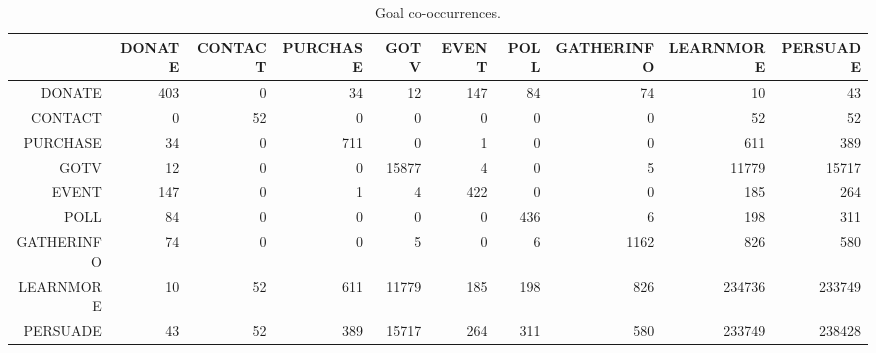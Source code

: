\begin{table}[ht]
\centering
\begingroup\scriptsize
\begin{tabular}{rrrrrrrrrr}
  \hline
 & DONATE & CONTACT & PURCHASE & GOTV & EVENT & POLL & GATHERINFO & LEARNMORE & PERSUADE \\ 
  \hline
DONATE & 403 & 0 & 34 & 12 & 147 & 84 & 74 & 10 & 43 \\ 
  CONTACT & 0 & 52 & 0 & 0 & 0 & 0 & 0 & 52 & 52 \\ 
  PURCHASE & 34 & 0 & 711 & 0 & 1 & 0 & 0 & 611 & 389 \\ 
  GOTV & 12 & 0 & 0 & 15877 & 4 & 0 & 5 & 11779 & 15717 \\ 
  EVENT & 147 & 0 & 1 & 4 & 422 & 0 & 0 & 185 & 264 \\ 
  POLL & 84 & 0 & 0 & 0 & 0 & 436 & 6 & 198 & 311 \\ 
  GATHERINFO & 74 & 0 & 0 & 5 & 0 & 6 & 1162 & 826 & 580 \\ 
  LEARNMORE & 10 & 52 & 611 & 11779 & 185 & 198 & 826 & 234736 & 233749 \\ 
  PERSUADE & 43 & 52 & 389 & 15717 & 264 & 311 & 580 & 233749 & 238428 \\ 
   \hline
\end{tabular}
\endgroup
\caption{Goal co-occurrences.} 
\label{tab:cooccurrences}
\end{table}
